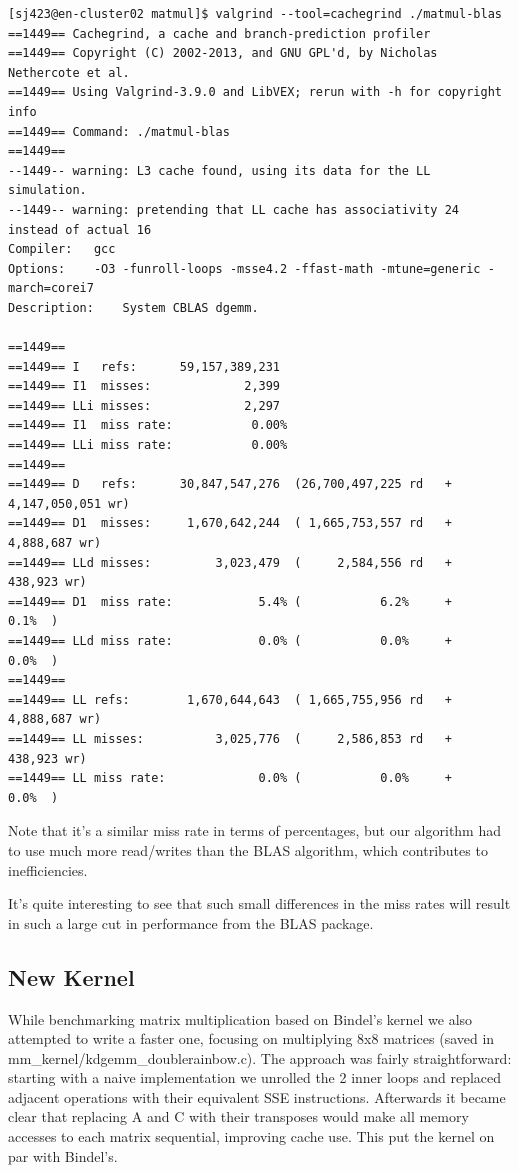 \documentclass{article}
\begin{document}
    \begin{lstlisting}
[sj423@en-cluster02 matmul]$ valgrind --tool=cachegrind ./matmul-blas 
==1449== Cachegrind, a cache and branch-prediction profiler
==1449== Copyright (C) 2002-2013, and GNU GPL'd, by Nicholas Nethercote et al.
==1449== Using Valgrind-3.9.0 and LibVEX; rerun with -h for copyright info
==1449== Command: ./matmul-blas
==1449== 
--1449-- warning: L3 cache found, using its data for the LL simulation.
--1449-- warning: pretending that LL cache has associativity 24 instead of actual 16
Compiler:	gcc
Options:	-O3 -funroll-loops -msse4.2 -ffast-math -mtune=generic -march=corei7
Description:	System CBLAS dgemm.

==1449== 
==1449== I   refs:      59,157,389,231
==1449== I1  misses:             2,399
==1449== LLi misses:             2,297
==1449== I1  miss rate:           0.00%
==1449== LLi miss rate:           0.00%
==1449== 
==1449== D   refs:      30,847,547,276  (26,700,497,225 rd   + 4,147,050,051 wr)
==1449== D1  misses:     1,670,642,244  ( 1,665,753,557 rd   +     4,888,687 wr)
==1449== LLd misses:         3,023,479  (     2,584,556 rd   +       438,923 wr)
==1449== D1  miss rate:            5.4% (           6.2%     +           0.1%  )
==1449== LLd miss rate:            0.0% (           0.0%     +           0.0%  )
==1449== 
==1449== LL refs:        1,670,644,643  ( 1,665,755,956 rd   +     4,888,687 wr)
==1449== LL misses:          3,025,776  (     2,586,853 rd   +       438,923 wr)
==1449== LL miss rate:             0.0% (           0.0%     +           0.0%  )
    \end{lstlisting}

    Note that it's a similar miss rate in terms of percentages, but our algorithm had to
    use much more read/writes than the BLAS algorithm, which contributes to inefficiencies.

    It's quite interesting to see that such small differences in the miss rates will result in such a large cut in performance
    from the BLAS package.

    \subsection{New Kernel}
While benchmarking matrix multiplication based on Bindel's kernel we also attempted to write a faster one, 
focusing on multiplying 8x8 matrices (saved in mm\_kernel/kdgemm\_doublerainbow.c). The approach was fairly straightforward: starting with a 
naive implementation we unrolled the 2 inner loops and replaced adjacent operations with their equivalent SSE instructions. 
Afterwards it became clear that replacing A and C with their transposes would make all memory accesses to each matrix sequential,
improving cache use. This put the kernel on par with Bindel's.
\end{document}

